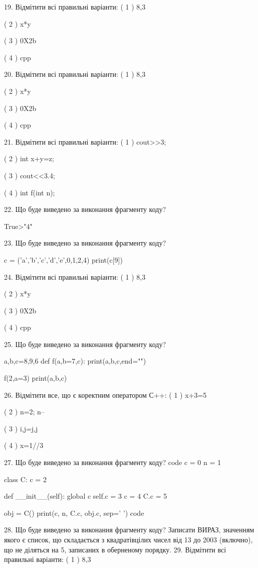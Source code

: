 \documentclass[11pt]{article}
\begin{document}
19. Відмітити всі правильні варіанти:
( 1 ) 8,3

( 2 ) x*y

( 3 ) 0X2b

( 4 ) cpp

20. Відмітити всі правильні варіанти:
( 1 ) 8,3

( 2 ) x*y

( 3 ) 0X2b

( 4 ) cpp

21. Відмітити всі правильні варіанти:
( 1 ) cout>>3;

( 2 ) int x+y=z;

( 3 ) cout<<3.4;

( 4 ) int f(int n);

22. Що буде виведено за виконання фрагменту коду?

True>"4"

23. Що буде виведено за виконання фрагменту коду?

c = ('a','b','c','d','e',0,1,2,4)
print(c[9])


24. Відмітити всі правильні варіанти:
( 1 ) 8,3

( 2 ) x*y

( 3 ) 0X2b

( 4 ) cpp

25. Що буде виведено за виконання фрагменту коду?

a,b,c=8,9,6
def f(a,b=7,c):
    print(a,b,c,end="")

f(2,a=3)
print(a,b,c)


26. Відмітити все, що є коректним оператором С++:
( 1 ) x+3=5

( 2 ) n=2; n--

( 3 ) i,j=j,j

( 4 ) x=1//3

27. Що буде виведено за виконання фрагменту коду?
code
c = 0
n = 1

class C:
    c = 2
    
    def __init__(self):
global c        self.c = 3
        c = 4
        C.c = 5

obj = C()
print(c, n, C.c, obj.c, sep=' ')
code

28. Що буде виведено за виконання фрагменту коду?
Записати ВИРАЗ, значенням якого є список, що складається з квадратівцілих чисел від 13 до 2003 (включно), що не діляться на 5, записаних в оберненому порядку.
29. Відмітити всі правильні варіанти:
( 1 ) 8,3
\end{document}
